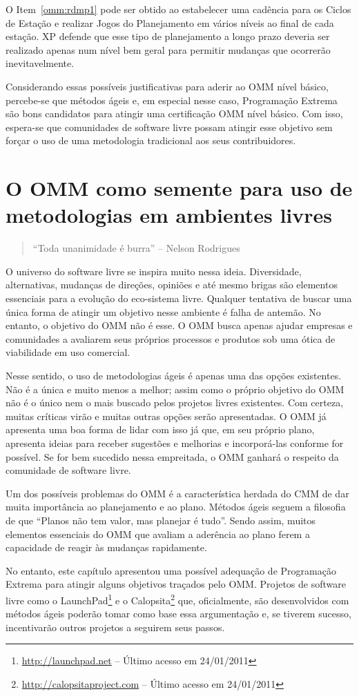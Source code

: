 O Item~\ref{omm:rdmp1} pode ser obtido ao estabelecer uma cadência
para os Ciclos de Estação e realizar Jogos do Planejamento em vários
níveis ao final de cada estação. XP defende que esse tipo de
planejamento a longo prazo deveria ser realizado apenas num nível bem
geral para permitir mudanças que ocorrerão inevitavelmente.

Considerando essas possíveis justificativas para aderir ao OMM nível
básico, percebe-se que métodos ágeis e, em especial nesse caso,
Programação Extrema são bons candidatos para atingir uma certificação
OMM nível básico. Com isso, espera-se que comunidades de software
livre possam atingir esse objetivo sem forçar o uso de uma metodologia
tradicional aos seus contribuidores.

\section[OMM no contexto livre]{O OMM como semente para uso de
  metodologias em ambientes livres}
\label{sec:sl+omm}

\begin{quote}
  ``Toda unanimidade é burra'' -- Nelson Rodrigues
\end{quote}

O universo do software livre se inspira muito nessa
ideia. Diversidade, alternativas, mudanças de direções, opiniões e até
mesmo brigas são elementos essenciais para a evolução do eco-sistema
livre. Qualquer tentativa de buscar uma única forma de atingir um
objetivo nesse ambiente é falha de antemão. No entanto, o objetivo do
OMM não é esse. O OMM busca apenas ajudar empresas e comunidades a
avaliarem seus próprios processos e produtos sob uma ótica de
viabilidade em uso comercial.

Nesse sentido, o uso de metodologias ágeis é apenas uma das opções
existentes.  Não é a única e muito menos a melhor; assim como o
próprio objetivo do OMM não é o único nem o mais buscado pelos
projetos livres existentes. Com certeza, muitas críticas virão e
muitas outras opções serão apresentadas. O OMM já apresenta uma boa
forma de lidar com isso já que, em seu próprio plano, apresenta ideias
para receber sugestões e melhorias e incorporá-las conforme for
possível.  Se for bem sucedido nessa empreitada, o OMM ganhará o
respeito da comunidade de software livre.

Um dos possíveis problemas do OMM é a característica herdada do CMM de
dar muita importância ao planejamento e ao plano. Métodos ágeis seguem
a filosofia de que ``Planos não tem valor, mas planejar é
tudo''. Sendo assim, muitos elementos essenciais do OMM que avaliam a
aderência ao plano ferem a capacidade de reagir às mudanças
rapidamente.

No entanto, este capítulo apresentou uma possível adequação de
Programação Extrema para atingir alguns objetivos traçados pelo
OMM. Projetos de software livre como o
LaunchPad\footnote{\url{http://launchpad.net} -- Último acesso em
  24/01/2011} e o
Calopsita\footnote{\url{http://calopsitaproject.com} -- Último
  acesso em 24/01/2011} que, oficialmente, são desenvolvidos com
métodos ágeis poderão tomar como base essa argumentação e, se tiverem
sucesso, incentivarão outros projetos a seguirem seus passos.
